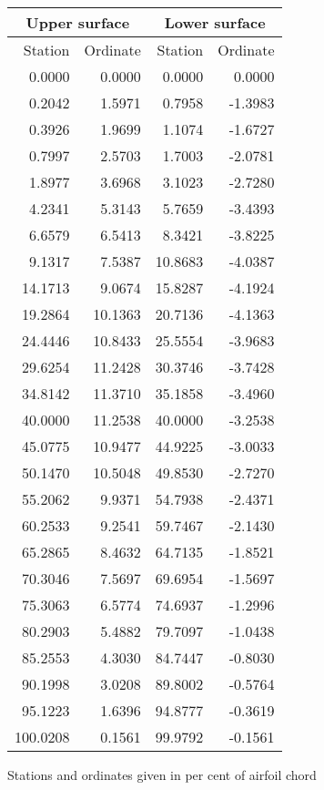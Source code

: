 \documentclass[11pt]{book}
\begin{document}
 \hspace{4mm}
 \begin{tabular}{|r|r|r|r|} \hline 
 \multicolumn{2}{|c|}{Upper surface} & \multicolumn{2}{|c|}{Lower surface} \\
 \hline
 Station & Ordinate & Station & Ordinate \\
 \hline
0.0000 & 0.0000 & 0.0000 & 0.0000 \\
0.2042 & 1.5971 & 0.7958 & -1.3983 \\
0.3926 & 1.9699 & 1.1074 & -1.6727 \\
0.7997 & 2.5703 & 1.7003 & -2.0781 \\
1.8977 & 3.6968 & 3.1023 & -2.7280 \\
4.2341 & 5.3143 & 5.7659 & -3.4393 \\
6.6579 & 6.5413 & 8.3421 & -3.8225 \\
9.1317 & 7.5387 & 10.8683 & -4.0387 \\
14.1713 & 9.0674 & 15.8287 & -4.1924 \\
19.2864 & 10.1363 & 20.7136 & -4.1363 \\
24.4446 & 10.8433 & 25.5554 & -3.9683 \\
29.6254 & 11.2428 & 30.3746 & -3.7428 \\
34.8142 & 11.3710 & 35.1858 & -3.4960 \\
40.0000 & 11.2538 & 40.0000 & -3.2538 \\
45.0775 & 10.9477 & 44.9225 & -3.0033 \\
50.1470 & 10.5048 & 49.8530 & -2.7270 \\
55.2062 & 9.9371 & 54.7938 & -2.4371 \\
60.2533 & 9.2541 & 59.7467 & -2.1430 \\
65.2865 & 8.4632 & 64.7135 & -1.8521 \\
70.3046 & 7.5697 & 69.6954 & -1.5697 \\
75.3063 & 6.5774 & 74.6937 & -1.2996 \\
80.2903 & 5.4882 & 79.7097 & -1.0438 \\
85.2553 & 4.3030 & 84.7447 & -0.8030 \\
90.1998 & 3.0208 & 89.8002 & -0.5764 \\
95.1223 & 1.6396 & 94.8777 & -0.3619 \\
100.0208 & 0.1561 & 99.9792 & -0.1561 \\
 \hline 
 \end{tabular}
 \vspace{8mm}

Stations and ordinates given in per cent of airfoil chord
\end{document}
